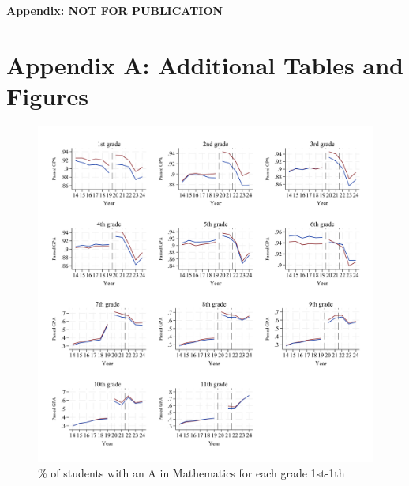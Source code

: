 \clearpage

\setcounter{figure}{0}
\renewcommand\thefigure{A.\arabic{figure}}    

\setcounter{table}{0}
\renewcommand{\thetable}{A.\arabic{table}}


\begin{center}
\huge
\textbf{Appendix: NOT FOR PUBLICATION}
\normalsize
\end{center}


\section*{Appendix A: Additional Tables and Figures} \label{sec:appa}
\newpage




\newpage














\begin{figure}[htbp]
         \centering
        \includegraphics[width=\textwidth]{./FIGURES/Descriptive/raw_grades_pass_math_siblings.pdf}
        \caption{\% of students with an A in Mathematics for each grade 1st-1th}
        \label{fig:trend_pass_grades}
\end{figure}

